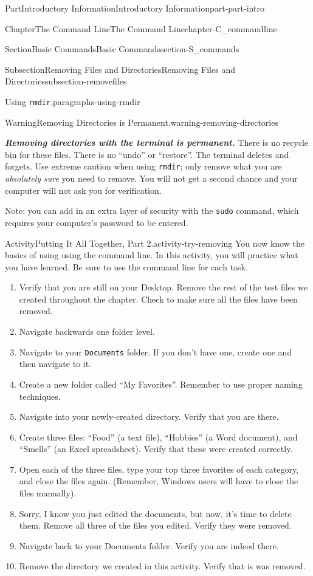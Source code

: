 \documentclass[oneside,10pt,]{book}
\newcommand{\mono}[1]{\texttt{#1}}
\newcommand{\alert}[1]{\textbf{\textit{#1}}}
\begin{document}
\begin{partptx}{Part}{Introductory Information}{}{Introductory Information}{}{}{part-part-intro}
\begin{chapterptx}{Chapter}{The Command Line}{}{The Command Line}{}{}{chapter-C_commandline}
\begin{sectionptx}{Section}{Basic Commands}{}{Basic Commands}{}{}{section-S_commands}
\begin{subsectionptx}{Subsection}{Removing Files and Directories}{}{Removing Files and Directories}{}{}{subsection-removefiles}
\begin{paragraphs}{Using \mono{rmdir}.}{paragraphs-using-rmdir}
\begin{warning}{Warning}{Removing Directories is Permanent.}{warning-removing-directories}
\par
\alert{Removing directories with the terminal is permanent.} There is no recycle bin for these files. There is no ``undo'' or ``restore''. The terminal deletes and forgets. Use extreme caution when using \mono{rmdir}; only remove what you are \emph{absolutely sure} you need to remove. You will not get a second chance and your computer will not ask you for verification.%
\par
Note: you can add in an extra layer of security with the \mono{sudo} command, which requires your computer's password to be entered.%
\end{warning}
\end{paragraphs}%
\begin{activity}{Activity}{Putting It All Together, Part 2.}{activity-try-removing}%
%
You now know the basics of using using the command line. In this activity, you will practice what you have learned. Be sure to use the command line for each task.%
\begin{enumerate}[font=\bfseries,label=(\alph*),ref=\alph*]%
\item{}Verify that you are still on your Desktop. Remove the rest of the test files we created throughout the chapter. Check to make sure all the files have been removed.%
\item{}Navigate backwards one folder level.%
\item{}Navigate to your \mono{Documents} folder. If you don't have one, create one and then navigate to it.%
\item{}Create a new folder called ``My Favorites''. Remember to use proper naming techniques.%
\item{}Navigate into your newly-created directory. Verify that you are there.%
\item{}Create three files: ``Food'' (a text file), ``Hobbies'' (a Word document), and ``Smells'' (an Excel spreadsheet). Verify that these were created correctly.%
\item{}Open each of the three files, type your top three favorites of each category, and close the files again. (Remember, Windows users will have to close the files manually).%
\item{}Sorry, I know you just edited the documents, but now, it's time to delete them. Remove all three of the files you edited. Verify they were removed.%
\item{}Navigate back to your Documents folder. Verify you are indeed there.%
\item{}Remove the directory we created in this activity. Verify that is was removed.%

\end{enumerate}
\end{activity}
\end{subsectionptx}
\end{sectionptx}
\end{chapterptx}
\end{partptx}
\end{document}
